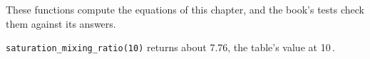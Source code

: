 These functions compute the equations of this chapter, and the book's tests check them against its answers.






\verb|saturation_mixing_ratio(10)| returns about 7.76, the table's value at 10\,\degC.
